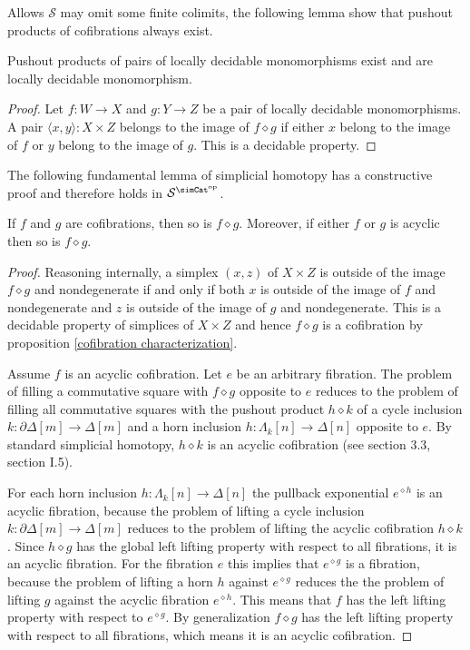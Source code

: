 \documentclass{tac}
\newcommand\cat\mathcal
\newcommand\dual{^{\mathrm{op}}}
\newcommand\s{^{\simCat\dual}}
\newcommand\of{:}
\newcommand\simplex\Delta
\newcommand\cycle{\partial\Delta}
\newcommand\horn\Lambda
\newcommand\pe[1]{^{\diamond #1}}
\newcommand\pp{\mathbin\diamond}
\newcommand\pair[2]{\langle #1,#2\rangle}
\begin{document}
Allows $\cat S$ may omit some finite colimits, the following lemma show that pushout products of cofibrations always exist.

\begin{lemma} Pushout products of pairs of locally decidable monomorphisms exist and are locally decidable monomorphism. \end{lemma}

\begin{proof} Let $f\of W\to X$ and $g\of Y\to Z$ be a pair of locally decidable monomorphisms. A pair $\pair xy\of X\times Z$ belongs to the image of $f\pp g$ if either $x$ belong to the image of $f$ or $y$ belong to the image of $g$. This is a decidable property.
\end{proof}

The following fundamental lemma of simplicial homotopy has a constructive proof and therefore holds in $\cat S\s$.

\begin{lemma} If $f$ and $g$ are cofibrations, then so is $f\pp g$. Moreover, if either $f$ or $g$ is acyclic then so is $f\pp g$. \label{pushout product} \end{lemma}

\begin{proof} Reasoning internally, a simplex $(x,z)$ of $X\times Z$ is outside of the image $f\pp g$ and nondegenerate if and only if both $x$ is outside of the image of $f$ and nondegenerate and $z$ is outside of the image of $g$ and nondegenerate. This is a decidable property of simplices of $X\times Z$ and hence $f\pp g$ is a cofibration by proposition \ref{cofibration characterization}. 

Assume $f$ is an acyclic cofibration. Let $e$ be an arbitrary fibration. The problem of filling a commutative square with $f\pp g$ opposite to $e$ reduces to the problem of filling all commutative squares with the pushout product $h\pp k$ of a cycle inclusion $k\of \cycle[m]\to \simplex[m]$ and a horn inclusion $h\of \horn_k[n]\to\simplex[n]$ opposite to $e$. By standard simplicial homotopy, $h\pp k$ is an acyclic cofibration (see \cite{Hovey99} section 3.3, \cite{GJSHT} section I.5).

For each horn inclusion $h\of \horn_k[n]\to \simplex[n]$ the pullback exponential $e\pe h$ is an acyclic fibration, because the problem of lifting a cycle inclusion $k\of \cycle[m]\to \simplex[m]$ reduces to the problem of lifting the acyclic cofibration $h\pp k$. Since $h\pp g$ has the global left lifting property with respect to all fibrations, it is an acyclic fibration. For the fibration $e$ this implies that $e\pe g$ is a fibration, because the problem of lifting a horn $h$ against $e\pe g$ reduces the the problem of lifting $g$ against the acyclic fibration $e\pe h$. This means that $f$ has the left lifting property with respect to $e\pe g$. By generalization $f\pp g$ has the left lifting property with respect to all fibrations, which means it is an acyclic cofibration.
\end{proof}
\end{document}
